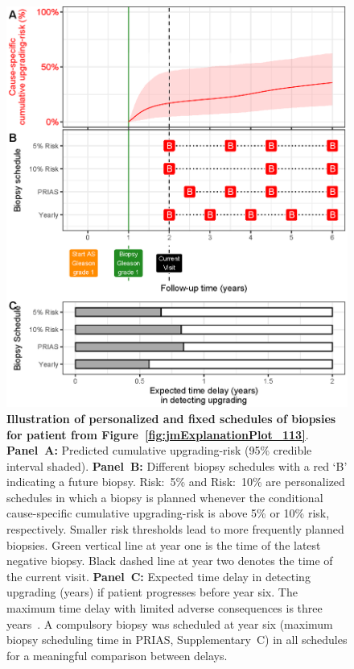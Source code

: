 \begin{figure}
\centerline{\includegraphics[width=\columnwidth]{images/demo_pat1.eps}}
\caption{\textbf{Illustration of personalized and fixed schedules of biopsies for patient from Figure~\ref{fig:jmExplanationPlot_113}}. \textbf{Panel~A:} Predicted cumulative upgrading-risk (95\% credible interval shaded). \textbf{Panel~B:} Different biopsy schedules with a red `B' indicating a future biopsy. Risk:~5\% and Risk:~10\% are personalized schedules in which a biopsy is planned whenever the conditional cause-specific cumulative upgrading-risk is above 5\% or 10\% risk, respectively. Smaller risk thresholds lead to more frequently planned biopsies. Green vertical line at year one is the time of the latest negative biopsy. Black dashed line at year two denotes the time of the current visit. \textbf{Panel~C:} Expected time delay in detecting upgrading (years) if patient progresses before year six. The maximum time delay with limited adverse consequences is three years~\citep{de2017estimating}. A compulsory biopsy was scheduled at year six (maximum biopsy scheduling time in PRIAS, Supplementary~C) in all schedules for a meaningful comparison between delays.}
\label{fig:demo_pat1}
\end{figure}

